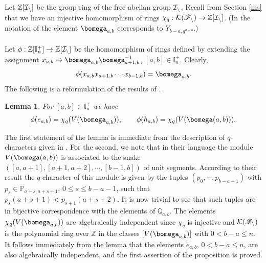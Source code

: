 \documentclass[11pt,reqno]{amsart}
\newtheorem*{lem}{Lemma}
\theoremstyle{definition} \newtheorem*{defn}{Definition}
\theoremstyle{definition}
\newenvironment{pf}{\proof}{\endproof}
\numberwithin{equation}{section}
\begin{document}
\subsubsection{} Let $\mathbb Z[\cal I_n]$ be the group ring of the free abelian group
$\cal I_n$. Recall from Section \ref{ms} that we have an injective homomorphism of rings $\chi_q:\cal K(\mathscr F_n)\to\mathbb Z[\cal I_n]$. (In the notation of \cite{FR99} the element
$\bomega_{a,b}$ corresponds to $Y_{b-a,q^{a+b}}$.)\\\\ Let
$\phi:\mathbb Z[\mathbb I_n^+]\to\mathbb Z[\cal I_n]$ be the homomorphism of rings defined by extending the assignment
$x_{a,b}\mapsto\bomega_{a,b}\bomega_{a+1,b}^{-1}$, $ [a,b]\in\mathbb I_n^+$.
Clearly, $$\phi(x_{a,b}x_{a+1,b}\cdots x_{b-1,b})=\bomega_{a,b}.$$
The following is a reformulation of the results of \cite{MY12}.
\begin{lem}\label{qchar} For $[a,b]\in\mathbb I_n^+$ we have
$$\phi(e_{a,b})=\chi_q(V(\bomega_{a,b})),\qquad \phi(h_{a,b})=\chi_q(V(\bomega(a,b))).$$
\end{lem}
\begin{pf} The first statement of the lemma is immediate from the description of $q$-characters given in \cite{MY12}. For the second, we note that in their language the module
$V(\bomega(a,b))$ is associated to the snake
$([a,a+1],[a+1,a+2],\cdots,[b-1,b])$ of unit segments. According to their result the $q$-character of this module is given by the tuples $(p_0,\cdots, p_{b-a-1})$ with $p_s\in\mathbb P_{a+s,a+s+1}$, $0\le s\le b-a-1$, such that $p_s(a+s+1)<p_{s+1}(a+s+2)$. It is now trivial to see that such tuples are in bijective correspondence with the elements of $\mathbb Q_{a,b}$.
\end{pf}
\medskip
The elements $\chi_q(V(\bomega_{a,b}))$
are algebraically independent since $\chi_q$ is injective and $\cal K(\mathscr F_n)$ is the polynomial ring over
$\mathbb Z$ in the classes $[V(\bomega_{a,b})]$ with $0<b-a\le n$. It follows immediately from the lemma that the elements $e_{a,b}$, $0<b-a\le n$,
 are also algebraically independent, and the first assertion of the proposition is proved.
\end{document}
